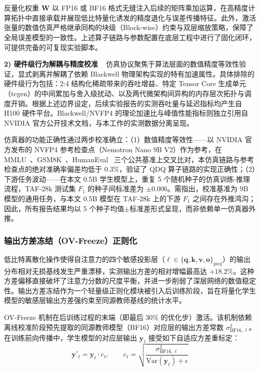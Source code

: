 \documentclass[11pt, a4paper]{article}
\begin{document}
反量化权重 $\widehat{\bm{W}}$ 以 FP16 或 BF16 格式无缝注入后续的矩阵乘加运算，在高精度计算拓扑中直接承载并展现低比特量化诱发的精度退化与误差传播特征。此外，激活张量的数值仿真严格继承同构的块级（Block-wise）约束与双层缩放策略，保障了全局误差模型的一致性。上述算子链路与参数配置在底层工程中进行了固化闭环，可提供完备的可复现实验脚本。

\textbf{2) 硬件级行为解耦与精度校准}
~ 仿真协议聚焦于算法层面的数值精度等效性验证，显式剥离并解耦了依赖 Blackwell 物理架构实现的特有加速属性。具体排除的硬件级行为包括：2:4 结构化稀疏带来的吞吐增益、特定 Tensor Core 生成单元（tcgen）的中间累加与舍入级扰动、以及两代微架构间异构的内存层次拓扑与调度开销。根据上述边界设定，后续实验报告的实测吞吐量与延迟指标均产生自 H100 硬件平台。Blackwell/NVFP4 的理论加速比与峰值性能指标则独立引用自 NVIDIA 官方公开技术文档，与本工作的实测数据分离呈现。

仿真器的功能正确性通过两步校准确立：（1）数值精度等效性——以 NVIDIA 官方发布的 NVFP4 参考检查点（Nemotron Nano 9B V2）作为参考，在 MMLU~\cite{30}、GSM8K~\cite{31}、HumanEval~\cite{32} 三个公共基准上交叉比对，本仿真链路与参考检查点的绝对准确率偏差均低于 $0.3\%$，验证了 QDQ 算子链路的实现正确性；（2）下游任务波动——在本文 0.5B 学生模型上，重复 5 个随机种子的仿真训练-推理流程，TAF-28k 测试集 $F_1$ 的种子间标准差为 $\pm 0.006$。需指出，校准基准为 9B 模型的通用任务，与本文 0.5B 模型在 TAF-28k 上的下游 $F_1$ 之间存在外推鸿沟；因此，所有报告结果均以 5 个种子均值$\pm$标准差形式呈现，而非依赖单一仿真器外推。

\subsubsection{输出方差冻结（OV-Freeze）正则化}

低比特离散化操作使得自注意力的四个敏感投影层（$\ell \in \{\bm{q}, \bm{k}, \bm{v}, \bm{o}\}_{\text{proj}}$）的输出分布相对无损基线发生严重漂移，实测输出方差的相对增幅最高达 $+18.2\%$。这种方差偏移直接破坏了注意力分数的尺度平衡，并进一步削弱了深层网络的数值稳定性。输出方差冻结作为一个轻量级正则化模块被引入后训练阶段，旨在将量化学生模型的敏感层输出方差强约束至同源教师基线的统计水平。

OV-Freeze 机制在后训练过程的末端（即最后 $30\%$ 的优化步）激活。该机制依赖离线校准阶段预先提取的同源教师模型（BF16）对应层的输出方差常数 $\sigma^2_{\text{BF16},\ell}$。在训练前向传播中，学生模型的对应层输出 $\bm{y}_\ell$ 接受如下自适应方差重标定：
\begin{equation}
\label{eq:ov_freeze_rescale}
    \bm{y}'_\ell
    = \bm{y}_\ell \cdot c_\ell,
    \qquad
    c_\ell
    = \sqrt{\frac{\sigma^2_{\text{BF16},\ell}}{\mathrm{Var}(\bm{y}_\ell)+\epsilon}}
\end{equation}
\end{document}
